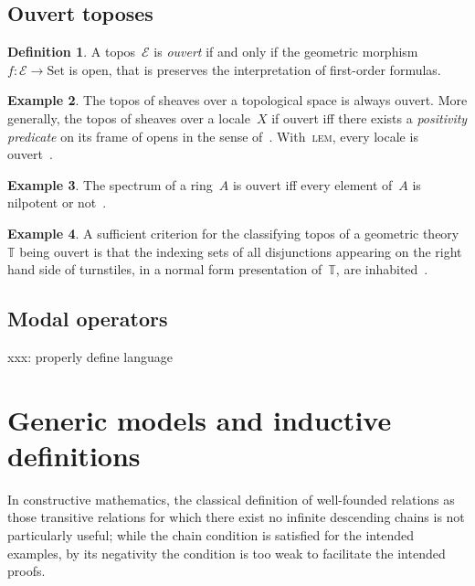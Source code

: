 \documentclass[oneside,reqno]{amsart}
\theoremstyle{definition}
\newtheorem{defn}{Definition}[section]
\newtheorem{ex}[defn]{Example}
\theoremstyle{plain}
\theoremstyle{remark}
\newcommand{\E}{\mathcal{E}}
\newcommand{\TT}{\mathbb{T}}
\newcommand{\Set}{\mathrm{Set}}
\renewcommand{\_}{\mathpunct{.}\,}
\newcommand{\?}{\,{:}\,}
\begin{document}
\subsection{Ouvert toposes}

\begin{defn}A topos~$\E$ is \emph{ouvert} if and only if the geometric
morphism~$f : \E \to \Set$ is open, that is preserves the interpretation of
first-order formulas.\end{defn}

\begin{ex}The topos of sheaves over a topological space is always ouvert. More
generally, the topos of sheaves over a locale~$X$ if ouvert iff there exists a
\emph{positivity predicate} on its frame of opens in the sense of~\cite{xxx}.
With~\textsc{lem}, every locale is ouvert~\cite{xxx}.\end{ex}

\begin{ex}The spectrum of a ring~$A$ is ouvert iff every element of~$A$ is
nilpotent or not~\cite[Proposition~12.51]{blechschmidt:phd}.\end{ex}

\begin{ex}A sufficient criterion for the classifying topos of a geometric
theory~$\TT$ being ouvert is that the indexing sets of all disjunctions
appearing on the right hand side of turnstiles, in a normal form presentation
of~$\TT$, are inhabited~\cite{xxx}.\end{ex}


\subsection{Modal operators}

xxx: properly define language


\section{Generic models and inductive definitions}
\label{sect:generic-models}

In constructive mathematics, the classical definition of well-founded relations
as those transitive relations for which there exist no infinite descending
chains is not particularly useful; while the chain condition is satisfied for
the intended examples, by its negativity the condition is too weak to
facilitate the intended proofs.
\end{document}
